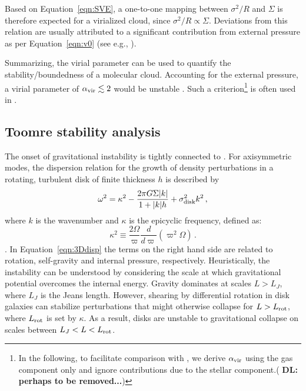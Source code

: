 \IfFileExists{emulateapjlegacy.cls}{\documentclass[iop]{emulateapjlegacy}}{\documentclass[iop]{emulateapj}}
\def\altomega{\varpi}
\newcommand{\DL}[1]{({\bf \color{dlcolor} DL: #1})}
\begin{document}
Based on Equation~\ref{eqn:SVE}, a one-to-one mapping between $\sigma^2/R$ and $\Sigma$ is therefore expected for a virialized cloud, since $\sigma^2/R\propto\Sigma$. Deviations from this relation are usually attributed to a significant contribution from external pressure as per Equation~\ref{eqn:v0} (see e.g., \citealt{Heyer09a, Hughes10a, Hughes13b, Meidt13a}).

Summarizing, the virial parameter can be used to quantify the stability/boundedness of 
    a molecular cloud.
Accounting for the external pressure, a virial parameter of $\alpha_{\rm vir}\lesssim2$ would be unstable \citep{bertoldi:1992}.
%
Such a criterion\footnote{In the following, to facilitate comparison with \obs, we derive $\alpha_{\rm vir}$ using the gas component only and ignore contributions due to the stellar component.\DL{perhaps to be removed...}} is often used in \obs \citep[see e.g., ][]{Kauffmann17b}. 

\subsection{Toomre stability analysis}\label{sec:Q}

The onset of gravitational instability is 
tightly connected to \SF \citep[e.g.,][]{Kennicutt89a, Wang94a, Li05b, Li06a}. 
For axisymmetric modes, the dispersion relation for the growth of density perturbations in a rotating, turbulent disk of finite thickness $h$ is described by
\begin{equation}
\omega^2 = \kappa^2 - \frac{2\pi G \Sigma |k|}{1 + |k| h} + \sigma_{\rm disk}^2 k^2\,,
\label{eqn:3Ddisp}
\end{equation}
where $k$ is the wavenumber and $\kappa$ is the epicyclic frequency, defined as:
\begin{equation}
\kappa^2\equiv\frac{2\Omega}{\altomega}\frac{d}{d\altomega}\left(\altomega^2\Omega\right)\,.
\label{eqn:kappa}
\end{equation}
\citep{Romeo92a}.
In Equation~\ref{eqn:3Ddisp} the terms on the right hand side are related to rotation, self-gravity and internal pressure, respectively. 
    Heuristically, the instability can be understood by considering the scale
 at which gravitational potential overcomes the internal energy. Gravity dominates at scales $L > L_J$, where $L_J$ is the Jeans length. However, 
   shearing by 
differential rotation in disk galaxies can stabilize perturbations 
    that might otherwise collapse for $L > L_{\rm rot}$, where $L_{\rm rot}$ is set by $\kappa$.
    As a result, disks are unstable to gravitational collapse on 
scales between $L_J < L < L_{\rm rot}$.  
\end{document}
